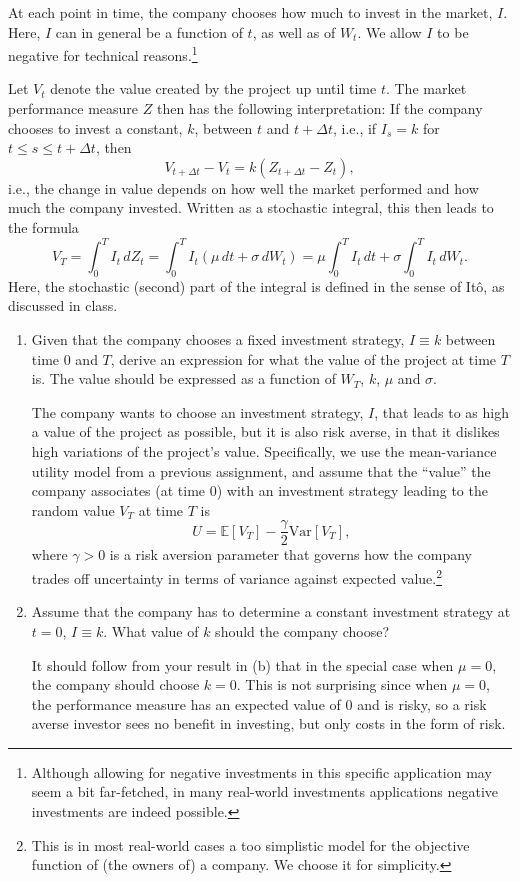 \documentclass{article}
\begin{document}
At each point in time, the company chooses how much to invest in the market, $I$. Here, $I$ can in general be a function of $t$, as well as of $W_t$. We allow $I$ to be negative for technical reasons.\footnote{Although allowing for negative investments in this specific application may seem a bit far-fetched, in many real-world investments applications negative investments are indeed possible.}

Let $V_t$ denote the value created by the project up until time $t$. The market performance measure $Z$ then has the following interpretation: If the company chooses to invest a constant, $k$, between $t$ and $t+\Delta t$, i.e., if $I_s=k$ for $t\le s\le t+\Delta t$, then
\[
V_{t+\Delta t}-V_t=k(Z_{t+\Delta t}-Z_t),
\]
i.e., the change in value depends on how well the market performed and how much the company invested. Written as a stochastic integral, this then leads to the formula
\[
V_T
=
\int_0^T I_t\,dZ_t
=
\int_0^T I_t(\mu\,dt+\sigma\,dW_t)
=
\mu\int_0^T I_t\,dt+\sigma\int_0^T I_t\,dW_t.
\]
Here, the stochastic (second) part of the integral is defined in the sense of It\^o, as discussed in class.

\begin{enumerate}
\item[(a)] Given that the company chooses a fixed investment strategy, $I\equiv k$ between time $0$ and $T$, derive an expression for what the value of the project at time $T$ is. The value should be expressed as a function of $W_T$, $k$, $\mu$ and $\sigma$.

The company wants to choose an investment strategy, $I$, that leads to as high a value of the project as possible, but it is also risk averse, in that it dislikes high variations of the project's value. Specifically, we use the mean-variance utility model from a previous assignment, and assume that the ``value'' the company associates (at time $0$) with an investment strategy leading to the random value $V_T$ at time $T$ is
\[
U=\mathbb{E}[V_T]-\frac{\gamma}{2}\mathrm{Var}[V_T],
\]
where $\gamma>0$ is a risk aversion parameter that governs how the company trades off uncertainty in terms of variance against expected value.\footnote{This is in most real-world cases a too simplistic model for the objective function of (the owners of) a company. We choose it for simplicity.}

\item[(b)] Assume that the company has to determine a constant investment strategy at $t=0$, $I\equiv k$. What value of $k$ should the company choose?

It should follow from your result in (b) that in the special case when $\mu=0$, the company should choose $k=0$. This is not surprising since when $\mu=0$, the performance measure has an expected value of $0$ and is risky, so a risk averse investor sees no benefit in investing, but only costs in the form of risk.
\end{enumerate}
\end{document}
